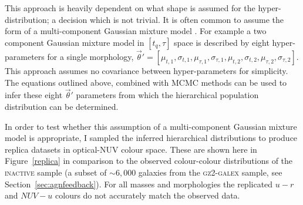 This approach is heavily dependent on what shape is assumed for the hyper-distribution; a decision which is not trivial. It is often common to assume the form of a multi-component Gaussian mixture model \citep{mackay03, lahav00}. For example a two component Gaussian mixture model in $[t_q, \tau]$ space is described by eight hyper-parameters for a single morphology, $\vec{\theta}' = [\mu_{t,1}, \sigma_{t,1}, \mu_{\tau,1}, \sigma_{\tau,1}, \mu_{t,2}, \sigma_{t,2}, \mu_{\tau,2}, \sigma_{\tau,2}]$. This approach assumes no covariance between hyper-parameters for simplicity. The equations outlined above, combined with MCMC methods can be used to infer these eight $\vec{\theta}'$ parameters from which the hierarchical population distribution can be determined. 



In order to test whether this assumption of a multi-component Gaussian mixture model is appropriate, I sampled the inferred hierarchical distributions to produce replica datasets in optical-NUV colour space. These are shown here in Figure~\ref{replica}  in comparison to the observed colour-colour distributions of the \textsc{inactive} sample (a subset of $\sim6,000$ galaxies from the \textsc{gz2-galex} sample, see Section~\ref{sec:agnfeedback}). For all masses and morphologies the replicated $u-r$ and $NUV-u$ colours do not accurately match the observed data. 


